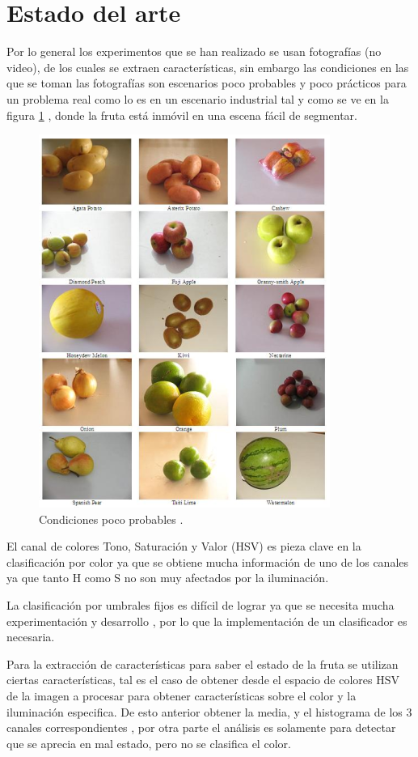 \documentclass[twoside,spanish,ESP,MSc]{plantillaLabUPV}
\theoremstyle{definition}
\begin{document}
\section{Estado del arte}
Por lo general los experimentos que se han realizado se usan fotografías (no video), de los cuales se extraen características, sin embargo las condiciones en las que se toman las fotografías son escenarios poco probables y poco prácticos para un problema real como lo es en un escenario industrial tal y como se ve en la figura \ref{chafa} \cite{chafafrut}, donde la fruta está inmóvil en una escena fácil de segmentar.

 \begin{figure}[!tbh]
\centering
\includegraphics*[scale=0.5]{datchafa} 
\caption{Condiciones poco probables \cite{chafafrut}.}
\label{chafa}
\end{figure}

El canal de colores Tono, Saturación y Valor (HSV) es pieza clave en la clasificación por color \cite{analis,chokun,rgbhisto,huehue,sugarhue} ya que se obtiene mucha información de uno de los canales ya que tanto H como S no son muy afectados por la iluminación.

La clasificación por umbrales fijos es difícil de lograr ya que se necesita mucha experimentación y desarrollo \cite{huehue,josu}, por lo que la implementación de un clasificador es necesaria.

Para la extracción de características para saber el estado de la fruta se utilizan ciertas características, tal es el caso de obtener desde el espacio de colores HSV de la imagen a procesar para obtener características sobre el color y la iluminación especifica. De esto anterior obtener la media, y el histograma de los 3 canales correspondientes \cite{analis,chokun}, por otra parte el análisis es solamente para detectar que se aprecia en mal estado, pero no se clasifica el color.
\end{document}
